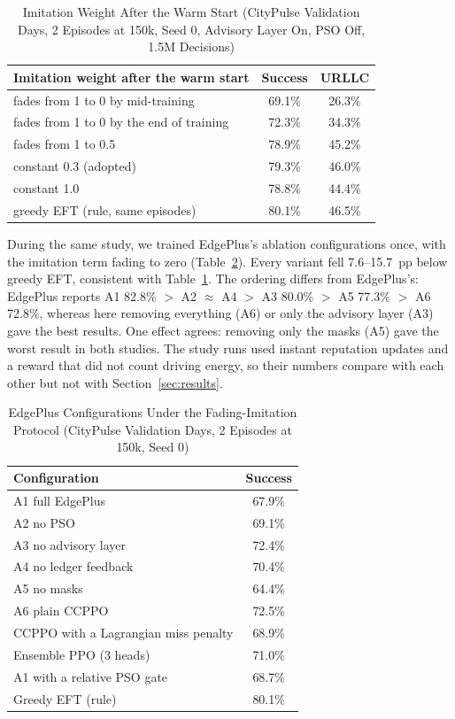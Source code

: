 \documentclass[11pt,journal,onecolumn]{IEEEtran}
\begin{document}
\begin{table}[!t]
\centering
\caption{Imitation Weight After the Warm Start (CityPulse Validation Days, 2 Episodes at 150k, Seed 0, Advisory Layer On, PSO Off, 1.5M Decisions)}
\label{tab:imitation}
\footnotesize
\begin{tabular}{p{}cc}
\toprule
Imitation weight after the warm start & Success & URLLC\\
\midrule
fades from 1 to 0 by mid-training & 69.1\% & 26.3\%\\
fades from 1 to 0 by the end of training & 72.3\% & 34.3\%\\
fades from 1 to 0.5 & 78.9\% & 45.2\%\\
constant 0.3 (adopted) & 79.3\% & 46.0\%\\
constant 1.0 & 78.8\% & 44.4\%\\
greedy EFT (rule, same episodes) & 80.1\% & 46.5\%\\
\bottomrule
\end{tabular}
\end{table}

During the same study, we trained EdgePlus's ablation configurations once, with the imitation term fading to zero (Table~\ref{tab:ablations}). Every variant fell 7.6--15.7~pp below greedy EFT, consistent with Table~\ref{tab:imitation}. The ordering differs from EdgePlus's: EdgePlus reports A1 82.8\% $>$ A2 $\approx$ A4 $>$ A3 80.0\% $>$ A5 77.3\% $>$ A6 72.8\%, whereas here removing everything (A6) or only the advisory layer (A3) gave the best results. One effect agrees: removing only the masks (A5) gave the worst result in both studies. The study runs used instant reputation updates and a reward that did not count driving energy, so their numbers compare with each other but not with Section~\ref{sec:results}.

\begin{table}[!t]
\centering
\caption{EdgePlus Configurations Under the Fading-Imitation Protocol (CityPulse Validation Days, 2 Episodes at 150k, Seed 0)}
\label{tab:ablations}
\footnotesize
\begin{tabular}{p{}c}
\toprule
Configuration & Success\\
\midrule
A1 full EdgePlus & 67.9\%\\
A2 no PSO & 69.1\%\\
A3 no advisory layer & 72.4\%\\
A4 no ledger feedback & 70.4\%\\
A5 no masks & 64.4\%\\
A6 plain CCPPO & 72.5\%\\
CCPPO with a Lagrangian miss penalty & 68.9\%\\
Ensemble PPO (3 heads) & 71.0\%\\
A1 with a relative PSO gate & 68.7\%\\
Greedy EFT (rule) & 80.1\%\\
\bottomrule
\end{tabular}
\end{table}
\end{document}
